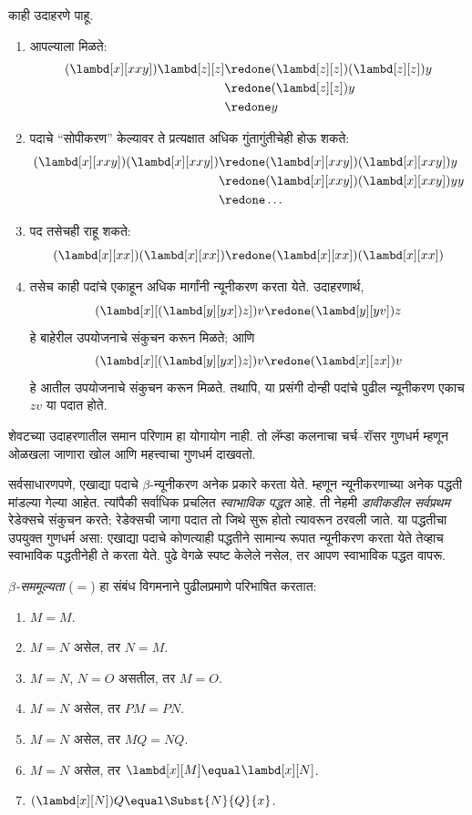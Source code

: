 \documentclass[../../../include/open-logic-section]{subfiles}
\begin{document}
काही उदाहरणे पाहू.
\begin{enumerate}
\item आपल्याला मिळते:
\begin{align*}
(\lambd[x][xxy]) \lambd[z][z] & \redone (\lambd[z][z])(\lambd[z][z]) y \\
& \redone (\lambd[z][z]) y \\
& \redone y
\end{align*}
\item पदाचे ``सोपीकरण'' केल्यावर ते प्रत्यक्षात अधिक गुंतागुंतीचेही होऊ शकते:
\begin{align*}
(\lambd[x][xxy])(\lambd[x][xxy]) & \redone (\lambd[x][xxy])(\lambd[x][xxy])y \\
& \redone (\lambd[x][xxy])(\lambd[x][xxy])yy \\
& \redone \dots
\end{align*}
\item पद तसेचही राहू शकते:
\[
(\lambd[x][xx])(\lambd[x][xx]) \redone (\lambd[x][xx])(\lambd[x][xx])
\]
\item तसेच काही पदांचे एकाहून अधिक मार्गांनी न्यूनीकरण
  करता येते. उदाहरणार्थ,
\[
(\lambd[x][(\lambd[y][yx]) z]) v \redone (\lambd[y][yv]) z
\]
हे बाहेरील उपयोजनाचे संकुचन करून मिळते; आणि
\[
(\lambd[x][(\lambd[y][yx]) z]) v \redone (\lambd[x][zx]) v
\]
हे आतील उपयोजनाचे संकुचन करून मिळते. तथापि,
या प्रसंगी दोन्ही पदांचे पुढील न्यूनीकरण एकाच
$zv$ या पदात होते.
\end{enumerate}

शेवटच्या उदाहरणातील समान परिणाम हा योगायोग नाही.
तो लॅम्डा कलनाचा चर्च–रॉसर गुणधर्म म्हणून ओळखला
जाणारा खोल आणि महत्त्वाचा गुणधर्म दाखवतो.

\begin{digress}
  सर्वसाधारणपणे, एखाद्या पदाचे $\beta$-न्यूनीकरण
  अनेक प्रकारे करता येते. म्हणून न्यूनीकरणाच्या अनेक
  पद्धती मांडल्या गेल्या आहेत. त्यांपैकी सर्वाधिक प्रचलित
  \emph{स्वाभाविक पद्धत} आहे. ती नेहमी \emph{डावीकडील
  सर्वप्रथम} रेडेक्सचे संकुचन करते; रेडेक्सची जागा
  पदात तो जिथे सुरू होतो त्यावरून ठरवली जाते.
  या पद्धतीचा उपयुक्त गुणधर्म असा: एखाद्या पदाचे
  कोणत्याही पद्धतीने सामान्य रूपात न्यूनीकरण करता येते
  तेव्हाच स्वाभाविक पद्धतीनेही ते करता येते. पुढे
  वेगळे स्पष्ट केलेले नसेल, तर आपण स्वाभाविक पद्धत वापरू.
\end{digress}

\begin{defn}
  \emph{$\beta$-सममूल्यता} ($\equal$) हा संबंध विगमनाने
  पुढीलप्रमाणे परिभाषित करतात:
  \begin{enumerate}
  \item $M \equal M$.
  \item $M \equal N$ असेल, तर $N \equal M$.
  \item $M \equal N$, $N \equal O$ असतील, तर $M \equal O$.
  \item $M \equal N$ असेल, तर $PM \equal PN$.
  \item $M \equal N$ असेल, तर $MQ \equal NQ$.
  \item $M \equal N$ असेल, तर $\lambd[x][M] \equal \lambd[x][N]$.
  \item $(\lambd[x][N])Q \equal \Subst{N}{Q}{x}$.
  \end{enumerate}
\end{defn}
\end{document}
